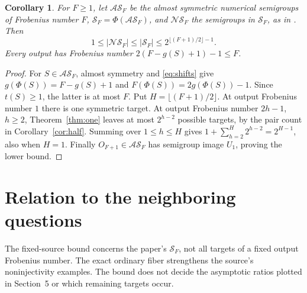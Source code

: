 \documentclass[11pt]{article}
\newtheorem{corollary}[theorem]{Corollary}
\newcommand{\AS}{\mathcal{AS}}
\begin{document}
\begin{corollary}\label{cor:source-bound}
For $F\geq1$, let $\AS_F$ be the almost symmetric numerical semigroups
of Frobenius number $F$, $\mathcal S_F=\Phi(\AS_F)$, and
$\mathcal{NS}_F$ the semigroups in $\mathcal S_F$, as in
\cite[Section~5, pp.~8--9]{DSY}. Then
\[
 1\leq|\mathcal{NS}_F|\leq|\mathcal S_F|
 \leq 2^{\lfloor(F+1)/2\rfloor-1}.
\]
Every output has Frobenius number $2(F-g(S)+1)-1\leq F$.
\end{corollary}
\begin{proof}
For $S\in\AS_F$, almost symmetry and \eqref{eq:shifts} give
$g(\Phi(S))=F-g(S)+1$ and $F(\Phi(S))=2g(\Phi(S))-1$.
Since $t(S)\geq1$, the latter is at most $F$.
Put $H=\lfloor(F+1)/2\rfloor$. At output Frobenius number $1$ there is
one symmetric target. At output Frobenius number $2h-1$, $h\geq2$,
Theorem~\ref{thm:one} leaves at most $2^{h-2}$ possible targets,
by the pair count in Corollary~\ref{cor:half}.
Summing over $1\leq h\leq H$ gives
$1+\sum_{h=2}^{H}2^{h-2}=2^{H-1}$, also when $H=1$.
Finally $O_{F+1}\in\AS_F$ has semigroup image $U_1$, proving the lower bound.
\end{proof}

\section{Relation to the neighboring questions}
The fixed-source bound concerns the paper's $\mathcal S_F$, not all targets
of a fixed output Frobenius number. The exact ordinary fiber strengthens
the source's noninjectivity examples. The bound does not decide the asymptotic
ratios plotted in Section~5 or which remaining targets occur.
\end{document}
